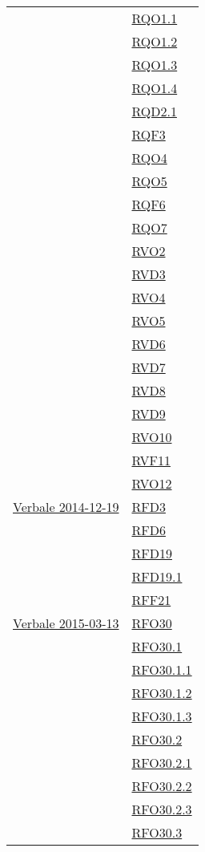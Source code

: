\begin{longtable}{|>{\centering}m{5cm}|m{5cm}<{\centering}|}
& \hyperlink{RQO1.1}{RQO1.1}\\
& \hyperlink{RQO1.2}{RQO1.2}\\
& \hyperlink{RQO1.3}{RQO1.3}\\
& \hyperlink{RQO1.4}{RQO1.4}\\
& \hyperlink{RQD2.1}{RQD2.1}\\
& \hyperlink{RQF3}{RQF3}\\
& \hyperlink{RQO4}{RQO4}\\
& \hyperlink{RQO5}{RQO5}\\
& \hyperlink{RQF6}{RQF6}\\
& \hyperlink{RQO7}{RQO7}\\
& \hyperlink{RVO2}{RVO2}\\
& \hyperlink{RVD3}{RVD3}\\
& \hyperlink{RVO4}{RVO4}\\
& \hyperlink{RVO5}{RVO5}\\
& \hyperlink{RVD6}{RVD6}\\
& \hyperlink{RVD7}{RVD7}\\
& \hyperlink{RVD8}{RVD8}\\
& \hyperlink{RVD9}{RVD9}\\
& \hyperlink{RVO10}{RVO10}\\
& \hyperlink{RVF11}{RVF11}\\
& \hyperlink{RVO12}{RVO12}\\ \hline
\hyperlink{Verbale 2014-12-19}{Verbale 2014-12-19} & \hyperlink{RFD3}{RFD3}\\
& \hyperlink{RFD6}{RFD6}\\
& \hyperlink{RFD19}{RFD19}\\
& \hyperlink{RFD19.1}{RFD19.1}\\
& \hyperlink{RFF21}{RFF21}\\ \hline
\hyperlink{Verbale 2015-03-13}{Verbale 2015-03-13} & \hyperlink{RFO30}{RFO30}\\
& \hyperlink{RFO30.1}{RFO30.1}\\
& \hyperlink{RFO30.1.1}{RFO30.1.1}\\
& \hyperlink{RFO30.1.2}{RFO30.1.2}\\
& \hyperlink{RFO30.1.3}{RFO30.1.3}\\
& \hyperlink{RFO30.2}{RFO30.2}\\
& \hyperlink{RFO30.2.1}{RFO30.2.1}\\
& \hyperlink{RFO30.2.2}{RFO30.2.2}\\
& \hyperlink{RFO30.2.3}{RFO30.2.3}\\
& \hyperlink{RFO30.3}{RFO30.3}\\

\end{longtable}
